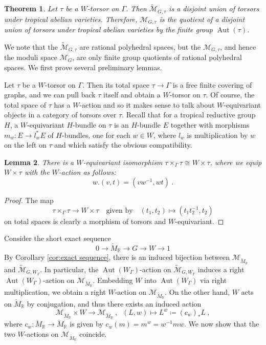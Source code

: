 \documentclass[10pt, a4paper]{amsart}
\newtheorem{theorem}{Theorem}[section]
\newtheorem{lemma}[theorem]{Lemma}
\theoremstyle{definition}
\theoremstyle{myitemstyle}
\newcommand{\R}{\mathbb{R}}
\newcommand{\Mcheck}{{\check{M}}}
\newcommand{\mc}[1]{{\mathcal{#1}}}
\newcommand{\wmc}[1]{{\widetilde{\mathcal{#1}}}}
\DeclareMathOperator{\Aut}{Aut}
\begin{document}
\begin{theorem}
\label{thm:description of component of tropical moduli space}
    Let $\tau$ be a $W$-torsor on $\Gamma$. Then $\wmc M_{G,\tau}$ is a disjoint union of torsors under tropical abelian varieties. Therefore, $\mc M_{G,\tau}$ is the quotient of a disjoint union of torsors under tropical abelian varieties by the finite group $\Aut(\tau)$.
\end{theorem}

We note that the $\wmc M_{G,\tau}$ are rational polyhedral spaces, but the $\mc M_{G,\tau}$, and hence the moduli space $\mc M_G$, are only finite group quotients of rational polyhedral spaces. We first prove several preliminary lemmas.

Let $\tau$ be a $W$-torsor on $\Gamma$. Then its total space $\tau\to \Gamma$ is a free finite covering of graphs, and we can pull back $\tau$ itself and obtain a $W$-torsor on $\tau$. Of course, the total space of $\tau$ has a $W$-action and so it makes sense to talk about $W$-equivariant objects in a category of torsors over $\tau$. Recall that for a tropical reductive group $H$,  a $W$-equivariant $H$-bundle on $\tau$ is an $H$-bundle $E$ together with morphisms $m_w\colon E\to l_w^*E$ of $H$-bundles, one for each $w\in W$, where $l_w$ is multiplication by $w$ on the left on $\tau$ and which satisfy the obvious compatibility.

\begin{lemma}
\label{lem:pull-back of tau by tau}
    There is a $W$-equivariant isomorphism $\tau\times_\Gamma\tau\cong W\times \tau$, where we equip $W\times \tau$ with the $W$-action as follows: 
    \[
    w.(v,t)=(vw^{-1},wt) \ .
    \]
\end{lemma}

\begin{proof}
    The map 
    \[
        \tau\times_\Gamma\tau\to W\times \tau \quad \text{given by}\quad (t_1,t_2)\mapsto (t_1t_2^{-1}, t_2)
    \]
    on total spaces is clearly a morphism of torsors and $W$-equivariant.
\end{proof}

Consider the short exact sequence
\[
0\to
    \Mcheck_\R \to
        G \to 
            W\to 
                1
\]
By Corollary \ref{cor:exact sequence}, there is an induced bijection between $\mc M_{\Mcheck_\R}$ and $\wmc M_{G,W_\Gamma}$. In particular, the $\Aut(W_\Gamma)$-action on $\wmc M_{G,W_\Gamma}$ induces a right $\Aut(W_\Gamma)$-action on $\mc M_{\Mcheck_\R}$. Embedding $W$ into $\Aut(W_\Gamma)$ via right multiplication, we obtain a right $W$-action on $\mc M_{\Mcheck_\R}$. On the other hand, $W$ acts on $\Mcheck_\R$ by conjugation, and thus there exists an induced action
\[
\mc M_{\Mcheck_\R} \times W\to \mc M_{\Mcheck_\R}\ , \;\; (L,w)\mapsto L^w\coloneqq (c_w)_*L \ ,
\]
where $c_w\colon \Mcheck_\R\to \Mcheck_\R$ is given by $c_w(m)=m^w=w^{-1} m w$. We now show that the two $W$-actions on $\mc M_{\Mcheck_\R}$ coincide.
\end{document}
